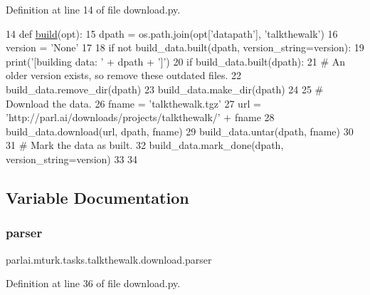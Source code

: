Definition at line 14 of file download.\+py.


\begin{DoxyCode}
14 \textcolor{keyword}{def }\hyperlink{namespaceparlai_1_1mturk_1_1tasks_1_1talkthewalk_1_1download_a8c0fbb9b6dfe127cb8c1bd6e7c4e33fd}{build}(opt):
15     dpath = os.path.join(opt[\textcolor{stringliteral}{'datapath'}], \textcolor{stringliteral}{'talkthewalk'})
16     version = \textcolor{stringliteral}{'None'}
17 
18     \textcolor{keywordflow}{if} \textcolor{keywordflow}{not} build\_data.built(dpath, version\_string=version):
19         print(\textcolor{stringliteral}{'[building data: '} + dpath + \textcolor{stringliteral}{']'})
20         \textcolor{keywordflow}{if} build\_data.built(dpath):
21             \textcolor{comment}{# An older version exists, so remove these outdated files.}
22             build\_data.remove\_dir(dpath)
23         build\_data.make\_dir(dpath)
24 
25         \textcolor{comment}{# Download the data.}
26         fname = \textcolor{stringliteral}{'talkthewalk.tgz'}
27         url = \textcolor{stringliteral}{'http://parl.ai/downloads/projects/talkthewalk/'} + fname
28         build\_data.download(url, dpath, fname)
29         build\_data.untar(dpath, fname)
30 
31         \textcolor{comment}{# Mark the data as built.}
32         build\_data.mark\_done(dpath, version\_string=version)
33 
34 
\end{DoxyCode}


\subsection{Variable Documentation}
\mbox{\label{namespaceparlai_1_1mturk_1_1tasks_1_1talkthewalk_1_1download_afc57e8bd20e5008ba31cf55a9d35df81}} 
\subsubsection{\texorpdfstring{parser}{parser}}
{\footnotesize\ttfamily parlai.\+mturk.\+tasks.\+talkthewalk.\+download.\+parser}



Definition at line 36 of file download.\+py.

